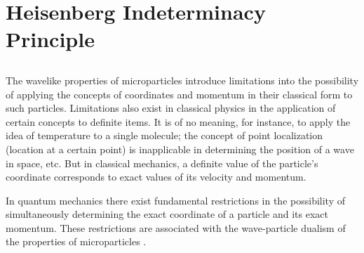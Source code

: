 \section{Heisenberg Indeterminacy Principle}
\label{sec-38.6} 


\subsection{}\label{38.6.1} The wavelike properties of microparticles  introduce limitations into the possibility of applying the concepts of coordinates and momentum in their classical form to such particles.
Limitations also exist in classical physics in the application of certain concepts to definite items. It is of no meaning, for instance, to apply the idea of temperature to a single molecule; the concept of point localization (location at a certain point) is inapplicable in determining the position of a wave in space, etc. But in classical mechanics, a definite value of the particle's coordinate corresponds to exact values of its velocity and momentum.

In quantum mechanics there exist fundamental restrictions
in the possibility of simultaneously determining the
exact coordinate of a particle and its exact momentum. These
restrictions are associated with the wave-particle dualism of
the properties of microparticles .

